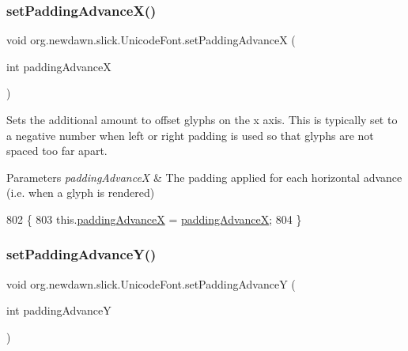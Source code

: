 \subsubsection{\texorpdfstring{set\+Padding\+Advance\+X()}{setPaddingAdvanceX()}}
{\footnotesize\ttfamily void org.\+newdawn.\+slick.\+Unicode\+Font.\+set\+Padding\+AdvanceX (\begin{DoxyParamCaption}\item[{int}]{padding\+AdvanceX }\end{DoxyParamCaption})\hspace{0.3cm}{\ttfamily [inline]}}

Sets the additional amount to offset glyphs on the x axis. This is typically set to a negative number when left or right padding is used so that glyphs are not spaced too far apart.


\begin{DoxyParams}{Parameters}
{\em padding\+AdvanceX} & The padding applied for each horizontal advance (i.\+e. when a glyph is rendered) \\
\hline
\end{DoxyParams}

\begin{DoxyCode}
802                                                          \{
803         this.\mbox{\hyperlink{classorg_1_1newdawn_1_1slick_1_1_unicode_font_a347a5d8b2baa6ab7f037d5f869504883}{paddingAdvanceX}} = \mbox{\hyperlink{classorg_1_1newdawn_1_1slick_1_1_unicode_font_a347a5d8b2baa6ab7f037d5f869504883}{paddingAdvanceX}};
804     \}
\end{DoxyCode}
\mbox{\label{classorg_1_1newdawn_1_1slick_1_1_unicode_font_ad10b4bc614f7e2b66e650726918940b2}} 
\subsubsection{\texorpdfstring{set\+Padding\+Advance\+Y()}{setPaddingAdvanceY()}}
{\footnotesize\ttfamily void org.\+newdawn.\+slick.\+Unicode\+Font.\+set\+Padding\+AdvanceY (\begin{DoxyParamCaption}\item[{int}]{padding\+AdvanceY }\end{DoxyParamCaption})\hspace{0.3cm}{\ttfamily [inline]}}

